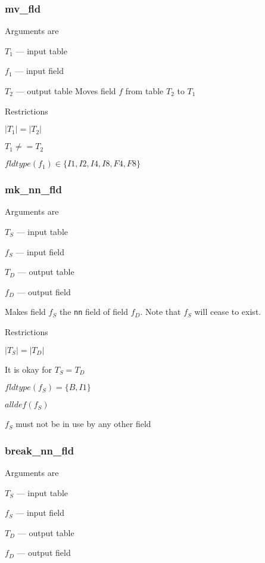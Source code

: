 \subsubsection{mv\_fld}
\label{mv_fld}

Arguments are
\be
\item \(T_1\) --- input table 
\item \(f_1\) --- input field 
\item \(T_2\) --- output table 
\ee
Moves field \(f\) from table \(T_2\) to \(T_1\)

Restrictions
\be
\item \(|T_1| = |T_2|\)
\item \(T_1 \neq = T_2\)
\item \(fldtype(f_1) \in \{I1, I2, I4, I8, F4, F8\}\)
\ee

\subsubsection{mk\_nn\_fld}
\label{mk_nn_fld}

Arguments are
\be
\item \(T_S\) --- input table 
\item \(f_S\) --- input field 
\item \(T_D\) --- output table 
\item \(f_D\) --- output field 
\ee

Makes field \(f_S\) the {\tt nn} field of field \(f_D\). Note that
\(f_S\) will cease to exist.

Restrictions
\be
\item \(|T_S| = |T_D|\)
\item It is okay for \(T_S = T_D\)
\item \(fldtype(f_S) = \{B, I1\} \) 
\item \(alldef(f_S)\)
\item \(f_S\) must not be in use by any other field 
\ee

\subsubsection{break\_nn\_fld}
\label{break_nn_fld}

Arguments are
\be
\item \(T_S\) --- input table 
\item \(f_S\) --- input field 
\item \(T_D\) --- output table 
\item \(f_D\) --- output field 
\ee

